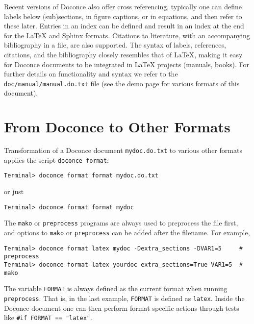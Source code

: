 \documentclass[%
oneside,                 %
final,                   %
10pt]{article}
\begin{document}
Recent versions of Doconce also offer cross referencing, typically one
can define labels below (sub)sections, in figure captions, or in
equations, and then refer to these later. Entries in an index can be
defined and result in an index at the end for the {\LaTeX} and Sphinx
formats. Citations to literature, with an accompanying bibliography in
a file, are also supported. The syntax of labels, references,
citations, and the bibliography closely resembles that of {\LaTeX},
making it easy for Doconce documents to be integrated in {\LaTeX}
projects (manuals, books). For further details on functionality and
syntax we refer to the {\fontsize{10pt}{10pt}\Verb!doc/manual/manual.do.txt!} file (see the
\href{{https://doconce.googlecode.com/hg/doc/demos/manual/index.html}}{demo page}
for various formats of this document).




\section{From Doconce to Other Formats}

\label{doconce2formats}

Transformation of a Doconce document {\fontsize{10pt}{10pt}\Verb!mydoc.do.txt!} to various other
formats applies the script {\fontsize{10pt}{10pt}\Verb!doconce format!}:
\vspace{4pt}
\begin{Verbatim}[numbers=none,frame=lines,label=\fbox{{\tiny Terminal}},fontsize=\fontsize{9pt}{9pt},
labelposition=topline,framesep=2.5mm,framerule=0.7pt]
Terminal> doconce format format mydoc.do.txt
\end{Verbatim}
or just
\vspace{4pt}
\begin{Verbatim}[numbers=none,frame=lines,label=\fbox{{\tiny Terminal}},fontsize=\fontsize{9pt}{9pt},
labelposition=topline,framesep=2.5mm,framerule=0.7pt]
Terminal> doconce format format mydoc
\end{Verbatim}
The {\fontsize{10pt}{10pt}\Verb!mako!} or {\fontsize{10pt}{10pt}\Verb!preprocess!} programs are always used to preprocess the
file first, and options to {\fontsize{10pt}{10pt}\Verb!mako!} or {\fontsize{10pt}{10pt}\Verb!preprocess!} can be added after the
filename. For example,
\vspace{4pt}
\begin{Verbatim}[numbers=none,frame=lines,label=\fbox{{\tiny Terminal}},fontsize=\fontsize{9pt}{9pt},
labelposition=topline,framesep=2.5mm,framerule=0.7pt]
Terminal> doconce format latex mydoc -Dextra_sections -DVAR1=5     # preprocess
Terminal> doconce format latex yourdoc extra_sections=True VAR1=5  # mako
\end{Verbatim}
The variable {\fontsize{10pt}{10pt}\Verb!FORMAT!} is always defined as the current format when
running {\fontsize{10pt}{10pt}\Verb!preprocess!}. That is, in the last example, {\fontsize{10pt}{10pt}\Verb!FORMAT!} is
defined as {\fontsize{10pt}{10pt}\Verb!latex!}. Inside the Doconce document one can then perform
format specific actions through tests like {\fontsize{10pt}{10pt}\Verb!#if FORMAT == "latex"!}.
\end{document}
